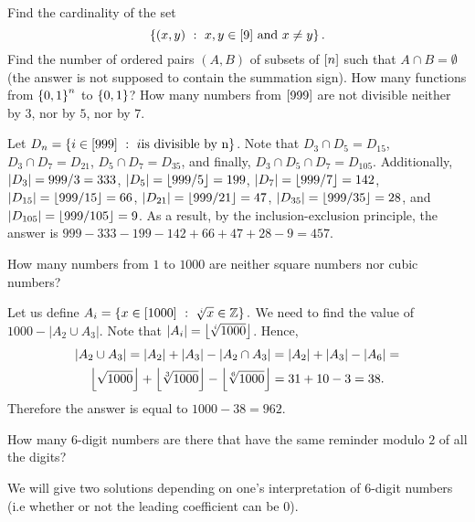\begin{chapterendexercises}
  \exercise
    Find the cardinality of the set
    \[
      \set[{x, y \in \range{9} \text{ and } x \neq y}]{(x, y)}.
    \]
  \exercise[recommended] Find the number of ordered pairs $(A, B)$ of subsets of
    ${[{n}]}$ such that $A \cap B = \emptyset$ (the answer is not supposed to
    contain the summation sign).
  \exercise How many functions from $\set{0, 1}^n$ to $\set{0, 1}$?
  \exercise[recommended] How many numbers from ${[{999}]}$ are not divisible
    neither by $3$, nor by $5$, nor by $7$.
    \begin{solution}
      Let $D_n = \set[i \text{is divisible by n}]{i \in \range{999}}$.
      Note that $D_3 \cap D_5 = D_{15}$, $D_3 \cap D_7 = D_{21}$, $D_5 \cap D_7
      = D_{35}$, and finally, $D_3 \cap D_5 \cap D_7 = D_{105}$. Additionally,
      $\left|{D_3}\right| = 999 / 3 = 333$,
      $\left|{D_5}\right| = \left\lfloor {999 / 5} \right\rfloor = 199$,
      $\left|{D_7}\right| = \left\lfloor {999 / 7} \right\rfloor = 142$,
      $\left|{D_{15}}\right| = \left\lfloor {999 / 15} \right\rfloor = 66$,
      $\left|{D_{21}}\right| = \left\lfloor {999 / 21} \right\rfloor = 47$,
      $\left|{D_{35}}\right| = \left\lfloor {999 / 35} \right\rfloor = 28$, and
      $\left|{D_{105}}\right| = \left\lfloor {999 / 105} \right\rfloor = 9$.
      As a result, by the inclusion-exclusion principle, the answer is
      $999 - 333 - 199 - 142 + 66 + 47 + 28 - 9 = 457$.
    \end{solution}
  \exercise How many numbers from $1$ to $1000$ are neither square numbers nor
    cubic numbers?
    \begin{solution}
      Let us define 
      $
        A_i =  \set[{\sqrt[i]{x} \in \Z}]{x \in \range{1000}}.
      $
      We need to find the value of $1000 - |A_2 \cup A_3|$. Note that 
      $\left|{A_i}\right| = \left\lfloor {\sqrt[i]{1000}} \right\rfloor$. Hence,
      \begin{multline*}
        \left|{A_2 \cup A_3}\right| = \left|{A_2}\right| + \left|{A_3}\right| -
        \left|{A_2 \cap A_3}\right| = \left|{A_2}\right| + \left|{A_3}\right| -
        \left|{A_6}\right| = \\
        \left\lfloor {\sqrt{1000}} \right\rfloor + \left\lfloor {\sqrt[3]{1000}} \right\rfloor - \left\lfloor {\sqrt[6]{1000}} \right\rfloor =
        31 + 10 - 3 = 38.
      \end{multline*}
      Therefore the answer is equal to $1000 - 38 = 962$.
    \end{solution}
  \exercise How many $6$-digit numbers are there that have the same reminder
    modulo $2$ of all the digits?
    \begin{solution}
      We will give two solutions depending on one's interpretation of $6$-digit
      numbers (i.e whether or not the leading coefficient can be $0$).


\end{solution}
\end{chapterendexercises}

